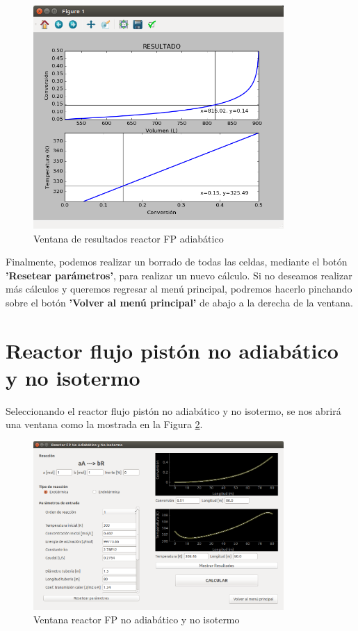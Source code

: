 \begin{figure}[h!]
	\begin{center}
		\includegraphics[width=0.85\textwidth]{./imagenes/reactor_fp/adiabatico2.png}\caption{Ventana de resultados reactor FP adiabático}\label{fig:ventana_graficas_ad}
	\end{center}
\end{figure}

Finalmente, podemos realizar un borrado de todas las celdas, mediante el botón \textbf{'Resetear parámetros'}, para realizar un nuevo cálculo. Si no deseamos realizar más cálculos y queremos regresar al menú principal, podremos hacerlo pinchando sobre el botón \textbf{'Volver al menú principal'} de abajo a la derecha de la ventana.


\section{Reactor flujo pistón no adiabático y no isotermo}
Seleccionando el reactor flujo pistón no adiabático y no isotermo, se nos abrirá una ventana como la mostrada en la Figura \ref{fig:ventana_noadi_noiso}.

\begin{figure}[h!]
	\begin{center}
		\includegraphics[width=0.85\textwidth]{./imagenes/reactor_fp/no_adi_no_iso1.png}\caption{Ventana reactor FP no adiabático y no isotermo}\label{fig:ventana_noadi_noiso}
	\end{center}
\end{figure}

